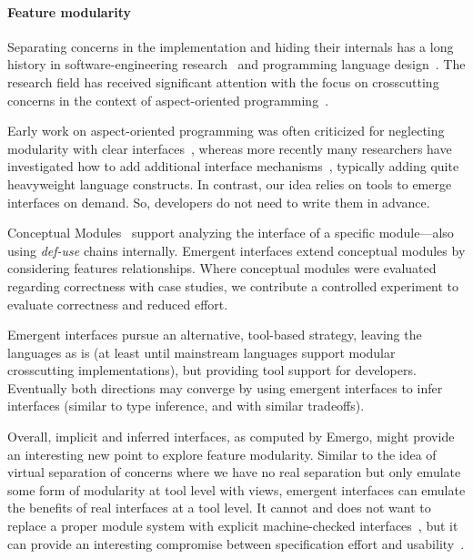 \paragraph{Feature modularity} Separating concerns in the implementation and hiding their internals has a long history in software-engineering research~\cite{parnas-criteria-cacm72} and programming language design~\cite{liskov-clu-77}. The research field has received significant attention with the focus on crosscutting concerns in the context of aspect-oriented programming~\cite{kiczales-aspectoriented-ecoop97}.

Early work on aspect-oriented programming was often criticized for neglecting modularity with clear interfaces~\cite{storzer-fragile-pointcut-04,S:OOPSLA06}, whereas more recently many researchers have investigated how to add additional interface mechanisms~\cite{aldrich-open-modules-ecoop05,SPAK:TOSEM10,GSSSTCR:IEEESoftware06,aspect-scope}, typically adding quite heavyweight language constructs. In contrast, our idea relies on tools to emerge interfaces on demand. So, developers do not need to write them in advance.


Conceptual Modules~\cite{baniassad-conceptual-module-icse98} support analyzing the interface of a specific module---also using \textit{def-use} chains internally. Emergent interfaces extend conceptual modules by considering features relationships. Where conceptual modules were evaluated regarding correctness with case studies, we contribute a controlled experiment to evaluate correctness and reduced effort.



Emergent interfaces pursue an alternative, tool-based strategy, leaving the languages as is (at least until mainstream languages support modular crosscutting implementations), but providing tool support for developers. Eventually both directions may converge by using emergent interfaces to infer interfaces (similar to type inference, and with similar tradeoffs).



Overall, implicit and inferred interfaces, as computed by Emergo, might provide an interesting new point to explore feature modularity. Similar to the idea of virtual separation of concerns where we have no real separation but only emulate some form of modularity at tool level with views, emergent interfaces can emulate the benefits of real interfaces at a tool level. It cannot and does not want to replace a proper module system with explicit machine-checked interfaces~\cite{aldrich-open-modules-ecoop05,SPAK:TOSEM10,GSSSTCR:IEEESoftware06,CB:SPLC08}, but it can provide an interesting compromise between specification effort and usability~\cite{fosd11}.


